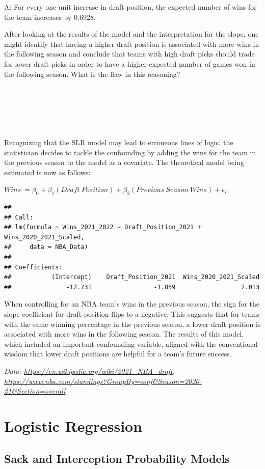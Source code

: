 \documentclass[
  11pt,
]{book}
\theoremstyle{definition}
\theoremstyle{definition}
\theoremstyle{definition}
\theoremstyle{definition}
\theoremstyle{remark}
\begin{document}
A: For every one-unit increase in draft position, the expected number of wins for the team increases by 0.6928.

After looking at the results of the model and the interpretation for the slope, one might identify that having a higher draft position is associated with more wins in the following season and conclude that teams with high draft picks should trade for lower draft picks in order to have a higher expected number of games won in the following season. What is the flaw in this reasoning?

\(~\)

\(~\)

\(~\)

Recognizing that the SLR model may lead to erroneous lines of logic, the statistician decides to tackle the confounding by adding the wins for the team in the previous season to the model as a covariate. The theoretical model being estimated is now as follows:

\(Wins\ = \beta_0 + \beta_1(Draft\ Position) + \beta_2(Previous\ Season\ Wins) + \epsilon_i\)

\begin{verbatim}
## 
## Call:
## lm(formula = Wins_2021_2022 ~ Draft_Position_2021 + Wins_2020_2021_Scaled, 
##     data = NBA_Data)
## 
## Coefficients:
##           (Intercept)    Draft_Position_2021  Wins_2020_2021_Scaled  
##               -12.731                 -1.859                  2.013
\end{verbatim}

When controlling for an NBA team's wins in the previous season, the sign for the slope coefficient for draft position flips to a negative. This suggests that for teams with the same winning percentage in the previous season, a lower draft position is associated with more wins in the following season. The results of this model, which included an important confounding variable, aligned with the conventional wisdom that lower draft positions are helpful for a team's future success.

\emph{Data: \url{https://en.wikipedia.org/wiki/2021_NBA_draft}, \url{https://www.nba.com/standings?GroupBy=conf\&Season=2020-21\&Section=overall}}

\hypertarget{logistic-regression}{%
\section{Logistic Regression}\label{logistic-regression}}

\hypertarget{sack-and-interception-probability-models}{%
\subsection{Sack and Interception Probability Models}\label{sack-and-interception-probability-models}}
\end{document}
